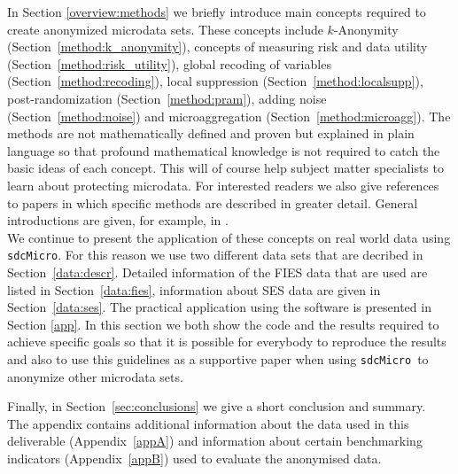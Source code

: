 \documentclass[12pt]{article}
\newcommand{\sdcMicro}{\texttt{sdcMicro}}
\begin{document}
In Section \ref{overview:methods} we briefly introduce main concepts required to create anonymized microdata sets. 
These concepts include $k$-Anonymity (Section~\ref{method:k_anonymity}), concepts of measuring risk and data utility 
(Section~\ref{method:risk_utility}), global recoding of variables (Section~\ref{method:recoding}), local suppression 
(Section~\ref{method:localsupp}), post-randomization (Section~\ref{method:pram}), adding noise (Section~\ref{method:noise}) 
and microaggregation 
(Section~\ref{method:microagg}). The methods are not mathematically defined and proven but explained in plain language 
so that profound mathematical knowledge is not required to catch the basic ideas of each concept. 
This will of course help subject matter specialists to learn about protecting microdata. 
For interested readers we also give references to papers in which specific methods are described in greater detail.
General introductions are given, for example, in \citep{HundepoolManual07,templ11book,Templ08f,Templ08tdp}. \\

We continue to present the application of these concepts on real world data using \sdcMicro. 
For this reason we use two different data sets that are decribed in Section~\ref{data:descr}. 
Detailed information of the FIES data that are used are listed in Section~\ref{data:fies}, information about SES data are given in 
Section~\ref{data:ses}. The practical application using the software is presented in Section \ref{app}. 
In this section we both show the code and the results required to achieve specific goals so that it is possible 
for everybody to reproduce the results and also to use this guidelines as a supportive paper when using \sdcMicro~to anonymize 
other microdata sets. 

Finally, in Section~\ref{sec:conclusions} we give a short conclusion and summary. \\

The appendix contains additional information about the data used  in this deliverable (Appendix~\ref{appA}) and 
information about certain  
benchmarking indicators (Appendix~\ref{appB}) used to evaluate the anonymised data.


\end{document}
